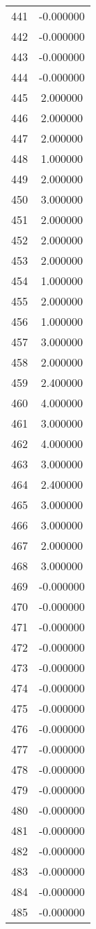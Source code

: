 \documentclass[12pt]{article}
\begin{document}
\begin{longtable}{@{}cc@{}}
441 & -0.000000 \\
442 & -0.000000 \\
443 & -0.000000 \\
444 & -0.000000 \\
445 & 2.000000 \\
446 & 2.000000 \\
447 & 2.000000 \\
448 & 1.000000 \\
449 & 2.000000 \\
450 & 3.000000 \\
451 & 2.000000 \\
452 & 2.000000 \\
453 & 2.000000 \\
454 & 1.000000 \\
455 & 2.000000 \\
456 & 1.000000 \\
457 & 3.000000 \\
458 & 2.000000 \\
459 & 2.400000 \\
460 & 4.000000 \\
461 & 3.000000 \\
462 & 4.000000 \\
463 & 3.000000 \\
464 & 2.400000 \\
465 & 3.000000 \\
466 & 3.000000 \\
467 & 2.000000 \\
468 & 3.000000 \\
469 & -0.000000 \\
470 & -0.000000 \\
471 & -0.000000 \\
472 & -0.000000 \\
473 & -0.000000 \\
474 & -0.000000 \\
475 & -0.000000 \\
476 & -0.000000 \\
477 & -0.000000 \\
478 & -0.000000 \\
479 & -0.000000 \\
480 & -0.000000 \\
481 & -0.000000 \\
482 & -0.000000 \\
483 & -0.000000 \\
484 & -0.000000 \\
485 & -0.000000 \\

\end{longtable}
\end{document}
